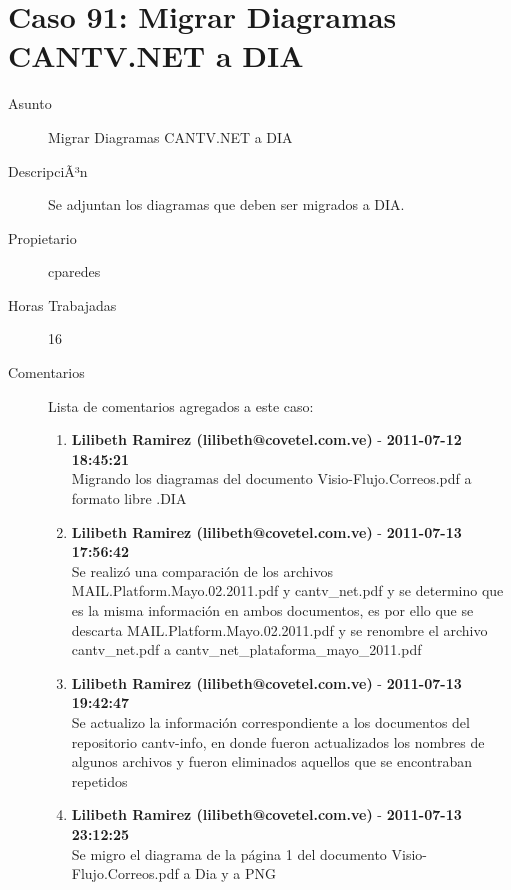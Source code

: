 \section{Caso 91: Migrar Diagramas CANTV.NET a DIA }

\begin{description}

\item[Asunto] Migrar Diagramas CANTV.NET a DIA\item[DescripciÃ³n] Se adjuntan los diagramas que deben ser migrados a DIA.\item[Propietario] cparedes\item[Horas Trabajadas] 16

\item[Comentarios] Lista de comentarios agregados a este caso:  
\begin{enumerate}
        \item {\bfseries Lilibeth Ramirez (lilibeth@covetel.com.ve)  } - {\bfseries 2011-07-12 18:45:21} \\ Migrando los diagramas del documento Visio-Flujo.Correos.pdf a formato libre
.DIA        \item {\bfseries Lilibeth Ramirez (lilibeth@covetel.com.ve)  } - {\bfseries 2011-07-13 17:56:42} \\ Se realizó una comparación de los archivos MAIL.Platform.Mayo.02.2011.pdf y
cantv_net.pdf y se determino que es la misma información en ambos documentos,
es por ello que se descarta MAIL.Platform.Mayo.02.2011.pdf y se renombre el
archivo cantv_net.pdf a cantv_net_plataforma_mayo_2011.pdf        \item {\bfseries Lilibeth Ramirez (lilibeth@covetel.com.ve)  } - {\bfseries 2011-07-13 19:42:47} \\ Se actualizo la información correspondiente a los documentos del repositorio
cantv-info, en donde fueron actualizados los nombres de algunos archivos y
fueron eliminados aquellos que se encontraban repetidos        \item {\bfseries Lilibeth Ramirez (lilibeth@covetel.com.ve)  } - {\bfseries 2011-07-13 23:12:25} \\ Se migro el diagrama de la página 1 del documento Visio-Flujo.Correos.pdf a Dia
y a PNG


\end{enumerate}
\end{description}
